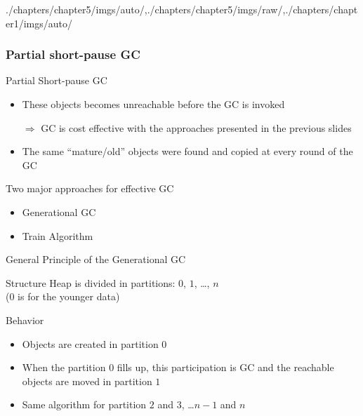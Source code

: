 \begin{graphicspathcontext}{{./chapters/chapter5/imgs/auto/},{./chapters/chapter5/imgs/raw/},{./chapters/chapter1/imgs/auto/}}
\begin{bibunit}[apalike]
\subsubsection{Partial short-pause GC}
\subsubsectiontableofcontentslide
\resetsectionsintoc

\begin{frame}{Partial Short-pause GC}
	\vspace{.25cm}
	\begin{itemize}
		\item These objects becomes unreachable before the GC is invoked
		\item[$\Rightarrow$] GC is cost effective with the approaches presented in the previous slides
	\end{itemize}
	\vspace{.25cm}
	\begin{itemize}
		\item The same ``mature/old'' objects were found and copied at every round of the GC
	\end{itemize}
	\vspace{.25cm}
	\begin{block}{Two major approaches for effective GC}
		\begin{itemize}
			\item Generational GC
			\item Train Algorithm
		\end{itemize}
	\end{block}
\end{frame}

\begin{frame}{{General Principle} of the Generational GC}
	\begin{block}{Structure}
		Heap is divided in partitions: $0$, $1$, \dots, $n$ \\
		($0$ is for the younger data)
	\end{block}
	\vspace{.5cm}
	\begin{block}{Behavior}
		\begin{itemize}
			\item Objects are created in partition $0$
			\item When the partition $0$ fills up, this participation is GC and the reachable objects are moved in partition $1$
			\item Same algorithm for partition $2$ and $3$, \dots $n-1$ and $n$
		\end{itemize}
	\end{block}
\end{frame}


\end{bibunit}
\end{graphicspathcontext}
